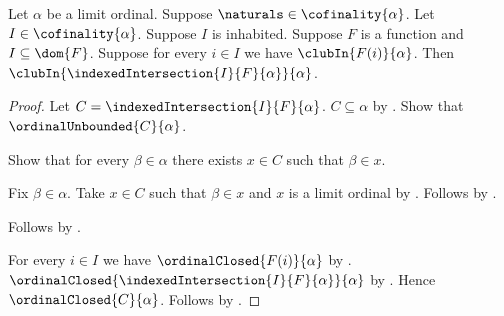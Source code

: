 \begin{theorem}\label{indexed_club_intersection}
    Let $\alpha$ be a limit ordinal.
    Suppose $\naturals\in\cofinality{\alpha}$.
    Let $I\in\cofinality{\alpha}$.
    Suppose $I$ is inhabited.
    Suppose $F$ is a function and $I\subseteq\dom{F}$.
    Suppose for every $i\in I$ we have $\clubIn{F(i)}{\alpha}$.
    Then $\clubIn{\indexedIntersection{I}{F}{\alpha}}{\alpha}$.
\end{theorem}
\begin{proof}
    Let $C=\indexedIntersection{I}{F}{\alpha}$.
    $C\subseteq\alpha$ by .
    Show that $\ordinalUnbounded{C}{\alpha}$.
    \begin{subproof}
        Show that for every $\beta\in\alpha$ there exists $x\in C$
            such that $\beta\in x$.
        \begin{subproof}
            Fix $\beta\in\alpha$.
            Take $x\in C$ such that $\beta\in x$ and
                $x$ is a limit ordinal
                by .
            Follows by \auto.
        \end{subproof}
        Follows by .
    \end{subproof}
    For every $i\in I$ we have $\ordinalClosed{F(i)}{\alpha}$
        by .
    $\ordinalClosed{\indexedIntersection{I}{F}{\alpha}}{\alpha}$
        by .
    Hence $\ordinalClosed{C}{\alpha}$.
    Follows by .
\end{proof}

